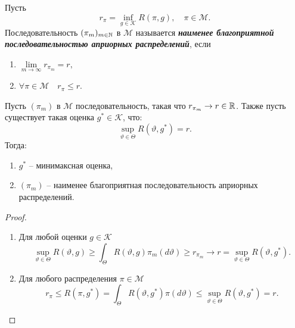 \begin{defn}
	Пусть
	\[ r_\pi = \inf_{g \in \mathcal{K}}R(\pi, g), \quad \pi \in \mathcal{M}. \]
	Последовательность $(\pi_m)_{m \in \mathbb{N}}$ в $\mathcal{M}$ называется \textbf{\textit{наименее благоприятной последовательностью априорных распределений}}, если
	\begin{enumerate}
		\item $\lim\limits_{m \rightarrow \infty} r_{\pi_m}=r,$
		\item $ \forall \pi \in \mathcal{M} \quad r_\pi \leq r.$
	\end{enumerate}
\end{defn}

\begin{thm} \label{thm3.16}
	Пусть $(\pi_m)$ в $\mathcal{M}$ последовательность, такая что  $r_{\pi_m} \rightarrow r \in \mathbb{R}$. Также пусть существует такая оценка $g^* \in \mathcal{K}$, что:
	\[ \sup_{\vartheta \in \Theta} R(\vartheta, g^*) = r. \]
	Тогда:
	\begin{enumerate}
		\item $g^*$ -- минимаксная оценка,
		\item $(\pi_m)$ -- наименее благоприятная последовательность априорных распределений.
	\end{enumerate}
\end{thm}

\begin{proof} \
	\begin{enumerate}
		\item Для любой оценки $g \in \mathcal{K}$
		\[ \sup_{\vartheta \in \Theta} R(\vartheta, g) \geq \int_{\Theta}R(\vartheta, g)\pi_m(d\vartheta) \geq r_{\pi_m} \longrightarrow r=\sup_{\vartheta \in \Theta}R(\vartheta, g^*). \]
		\item Для любого распределения $\pi \in \mathcal{M}$
		\[ r_\pi \leq R(\pi, g^*)=\int_{\Theta} R(\vartheta, g^*) \pi(d \vartheta) \leq \sup_{\vartheta \in \Theta}R(\vartheta, g^*)=r. \]
	\end{enumerate}
\end{proof}

